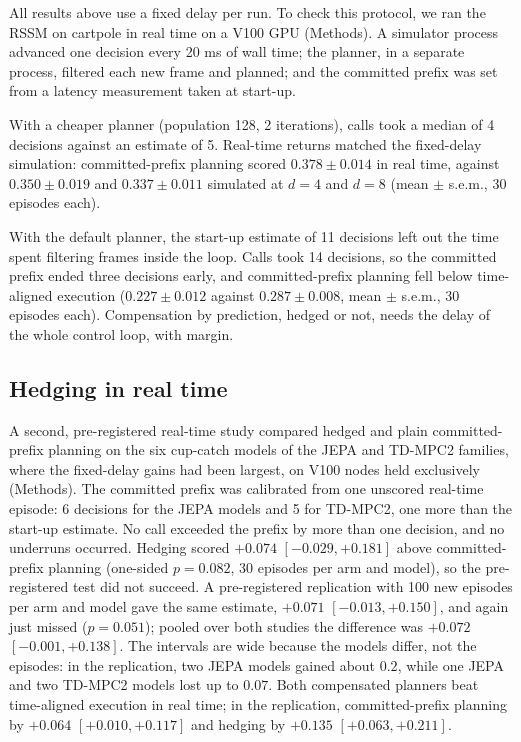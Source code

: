 \documentclass[aps,physrev,\manuscriptlayout,superscriptaddress,
  longbibliography,amsmath,amssymb]{revtex4-2}
\begin{document}
All results above use a fixed delay per run. To check this protocol, we ran the RSSM on cartpole in real time on a V100 GPU (Methods). A simulator process advanced one decision every 20 ms of wall time; the planner, in a separate process, filtered each new frame and planned; and the committed prefix was set from a latency measurement taken at start-up.

With a cheaper planner (population 128, 2 iterations), calls took a median of 4 decisions against an estimate of 5. Real-time returns matched the fixed-delay simulation: committed-prefix planning scored $0.378\pm0.014$ in real time, against $0.350\pm0.019$ and $0.337\pm0.011$ simulated at $d=4$ and $d=8$ (mean $\pm$ s.e.m., 30 episodes each).

With the default planner, the start-up estimate of 11 decisions left out the time spent filtering frames inside the loop. Calls took 14 decisions, so the committed prefix ended three decisions early, and committed-prefix planning fell below time-aligned execution ($0.227\pm0.012$ against $0.287\pm0.008$, mean $\pm$ s.e.m., 30 episodes each). Compensation by prediction, hedged or not, needs the delay of the whole control loop, with margin.

\subsection{Hedging in real time}\label{sec:realtime-hedge}

A second, pre-registered real-time study compared hedged and plain committed-prefix planning on the six cup-catch models of the JEPA and TD-MPC2 families, where the fixed-delay gains had been largest, on V100 nodes held exclusively (Methods). The committed prefix was calibrated from one unscored real-time episode: 6 decisions for the JEPA models and 5 for TD-MPC2, one more than the start-up estimate. No call exceeded the prefix by more than one decision, and no underruns occurred. Hedging scored $+0.074$ $[-0.029, +0.181]$ above committed-prefix planning (one-sided $p=0.082$, 30 episodes per arm and model), so the pre-registered test did not succeed. A pre-registered replication with 100 new episodes per arm and model gave the same estimate, $+0.071$ $[-0.013, +0.150]$, and again just missed ($p=0.051$); pooled over both studies the difference was $+0.072$ $[-0.001, +0.138]$. The intervals are wide because the models differ, not the episodes: in the replication, two JEPA models gained about $0.2$, while one JEPA and two TD-MPC2 models lost up to $0.07$. Both compensated planners beat time-aligned execution in real time; in the replication, committed-prefix planning by $+0.064$ $[+0.010, +0.117]$ and hedging by $+0.135$ $[+0.063, +0.211]$.
\end{document}
